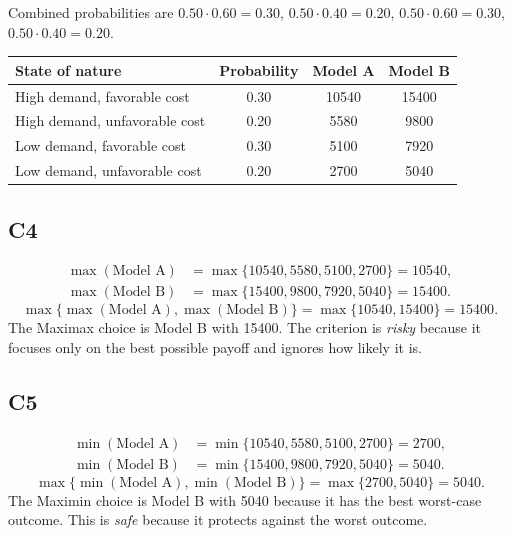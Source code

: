 		Combined probabilities are $0.50\cdot 0.60=0.30$, $0.50\cdot 0.40=0.20$, $0.50\cdot 0.60=0.30$, $0.50\cdot 0.40=0.20$.
		\begin{center}
			\begin{tabular}{l c c c}
				\toprule
				State of nature & Probability & Model A & Model B \\
				\midrule
				High demand, favorable cost & 0.30 & 10540 & 15400 \\
				High demand, unfavorable cost & 0.20 & 5580 & 9800 \\
				Low demand, favorable cost & 0.30 & 5100 & 7920 \\
				Low demand, unfavorable cost & 0.20 & 2700 & 5040 \\
				\bottomrule
			\end{tabular}
		\end{center}

		\subsection*{C4}
		\[
		\begin{aligned}
		\max(\text{Model A}) &= \max\{10540,5580,5100,2700\} = 10540,\\
		\max(\text{Model B}) &= \max\{15400,9800,7920,5040\} = 15400.
		\end{aligned}
		\]
		\[
		\max\{\max(\text{Model A}), \max(\text{Model B})\}
		= \max\{10540, 15400\}
		= 15400.
		\]
		The Maximax choice is Model B with 15400. The criterion is \emph{risky} because it focuses only on the best possible payoff and ignores how likely it is.

		\subsection*{C5}
		\[
		\begin{aligned}
		\min(\text{Model A}) &= \min\{10540,5580,5100,2700\} = 2700,\\
		\min(\text{Model B}) &= \min\{15400,9800,7920,5040\} = 5040.
		\end{aligned}
		\]
		\[
		\max\{\min(\text{Model A}), \min(\text{Model B})\}
		= \max\{2700, 5040\}
		= 5040.
		\]
		The Maximin choice is Model B with 5040 because it has the best worst-case outcome. This is \emph{safe} because it protects against the worst outcome.

